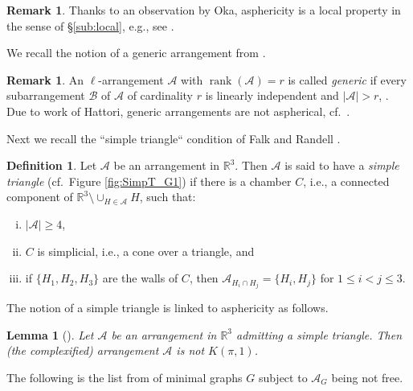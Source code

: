 \documentclass[12pt]{amsart}
\newcommand\CA{{\mathscr A}}
\newcommand\CB{{\mathscr B}}
\newcommand\BBR{{\mathbb R}}
\newcommand\rank{\operatorname{rank}}
\numberwithin{equation}{section}
\theoremstyle{plain}
\newtheorem{lemma}[equation]{Lemma}
\theoremstyle{definition}
\newtheorem{defn}[equation]{Definition}
\newtheorem{remark}[equation]{Remark}
\begin{document}
\begin{remark}
	\label{rem:local}
	Thanks to an observation by Oka,
	asphericity is a local property in the sense of
	\S \ref{sub:local},
	e.g., see \cite[Lem.~1.1]{paris:deligne}.
\end{remark}

We recall the notion of a generic arrangement from \cite[Def.~5.22]{orlikterao:arrangements}.

\begin{remark}
	\label{rem:generic}
An 
$\ell$-arrangement $\CA$ with $\rank(\CA)=r$ is called \emph{generic} if 
every subarrangement $\CB$ of $\CA$ of cardinality $r$ is linearly independent and $|\CA| > r$, \cite[Def.~5.22]{orlikterao:arrangements}.
Due to work of Hattori, 
generic arrangements are not aspherical, cf.~\cite[Cor.~5.23]{orlikterao:arrangements}.
\end{remark}
Next we recall the ``simple triangle`` condition of Falk and Randell \cite[Cor.~3.3, (3.12)]{falkrandell:homotopy}.

	
\begin{defn}
	\label{def:simpleT}
	Let $\CA$ be an arrangement in $\BBR^3$. 
	Then $\CA$ is said to have a \emph{simple triangle} (cf.\ Figure \ref{fig:SimpT_G1}) if there is a chamber $C$, 
	i.e., a connected component of $\BBR^3 \setminus \cup_{H \in \CA}H$,
	such that:
	\begin{enumerate}[(i)]
		\item $|\CA|\geq 4$,
		\item $C$ is simplicial, i.e., a cone over a triangle, and
		\item if $\{H_1,H_2,H_3\}$ are the walls of $C$, then $\CA_{H_i\cap H_j} = \{H_i,H_j\}$ for $1\leq i<j\leq3$.
	\end{enumerate}
\end{defn}	

The notion of a simple triangle is linked to asphericity as follows.

\begin{lemma}[{\cite[Cor.~3.3]{falkrandell:homotopy}}]
	\label{lem:SimpleT}
	Let $\CA$ be an arrangement  in $\BBR^3$ admitting a simple triangle.
	Then (the complexified) arrangement $\CA$ is not $K(\pi,1)$.
\end{lemma}

The following is the list from \cite{cuntzkuehne:subgraphs}
of minimal graphs $G$ subject to $\CA_G$ being not free.
\end{document}
